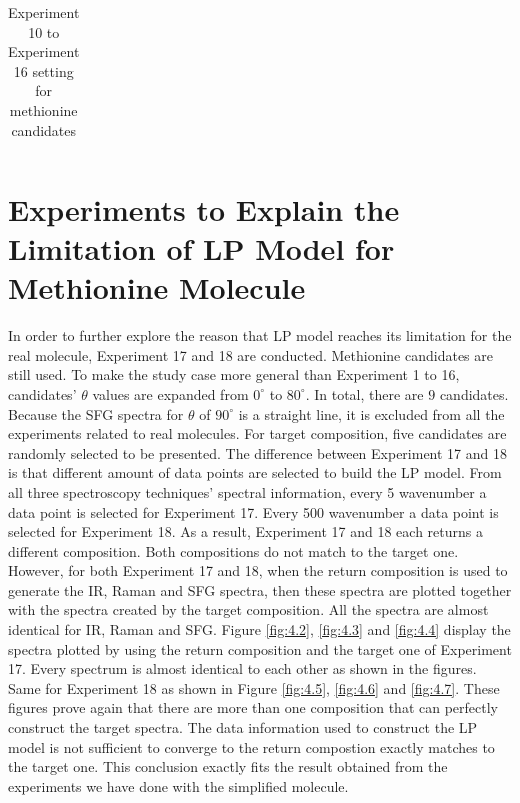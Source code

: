 \begin{table}
\begin{center}
{\begin{tabular}{| l | p{3cm} | l | l |}
\end{tabular} 
}
\end{center}
\caption{Experiment 10 to Experiment 16 setting for methionine candidates} \label{tab:4.3}
\end{table}

\section{Experiments to Explain the Limitation of LP Model for Methionine Molecule}

In order to further explore the reason that LP model reaches its limitation for the real molecule, Experiment 17 and 18 are conducted. Methionine candidates are still used. To make the study case more general than Experiment 1 to 16, candidates' $\theta$ values are expanded from $0^{\circ}$ to $80^{\circ}$. In total, there are $9$ candidates. Because the SFG spectra for $\theta$ of $90^{\circ}$ is a straight line, it is excluded from all the experiments related to real molecules. For target composition, five candidates are randomly selected to be presented. The difference between Experiment 17 and 18 is that different amount of data points are selected to build the LP model. From all three spectroscopy techniques' spectral information, every 5 wavenumber a data point is selected for Experiment 17. Every 500 wavenumber a data point is selected for Experiment 18. As a result, Experiment 17 and 18 each returns a different composition. Both compositions do not match to the target one. \\

However, for both Experiment 17 and 18, when the return composition is used to generate the IR, Raman and SFG spectra, then these spectra are plotted together with the spectra created by the target composition. All the spectra are almost identical for IR, Raman and SFG. Figure \ref{fig:4.2}, \ref{fig:4.3} and \ref{fig:4.4} display the spectra plotted by using the return composition and the target one of Experiment 17. Every spectrum is almost identical to each other as shown in the figures. Same for Experiment 18 as shown in Figure \ref{fig:4.5}, \ref{fig:4.6} and \ref{fig:4.7}. These figures prove again that there are more than one composition that can perfectly construct the target spectra. The data information used to construct the LP model is not sufficient to converge to the return compostion exactly matches to the target one. This conclusion exactly fits the result obtained from the experiments we have done with the simplified molecule.\\

